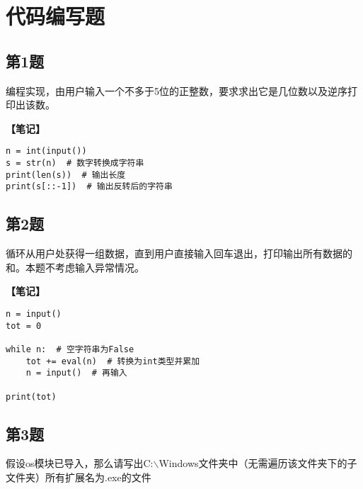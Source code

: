 \section{代码编写题}

\subsection{第1题}
编程实现，由用户输入一个不多于5位的正整数，要求求出它是几位数以及逆序打印出该数。

\begin{mdframed}
  \textbf{\color{red}【笔记】}

    \begin{lstlisting}
n = int(input())
s = str(n)  # 数字转换成字符串
print(len(s))  # 输出长度
print(s[::-1])  # 输出反转后的字符串

    \end{lstlisting}
\end{mdframed}

\subsection{第2题}
循环从用户处获得一组数据，直到用户直接输入回车退出，打印输出所有数据的和。本题不考虑输入异常情况。

\begin{mdframed}
  \textbf{\color{red}【笔记】}

    \begin{lstlisting}
n = input()
tot = 0

while n:  # 空字符串为False
    tot += eval(n)  # 转换为int类型并累加
    n = input()  # 再输入

print(tot)
    \end{lstlisting}
\end{mdframed}

\subsection{第3题}
假设os模块已导入，那么请写出C:$\backslash$Windows文件夹中（无需遍历该文件夹下的子文件夹）所有扩展名为.exe的文件

